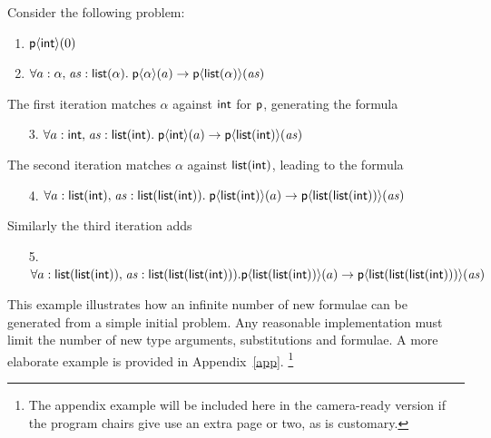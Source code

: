 \documentclass[runningheads]{llncs}
\begin{document}
\begin{examplex}\rm
Consider the following problem:
\begin{enumerate}
   \item \(\textsf{p}\langle \textsf{int}\rangle(0)\)
   \item \(\forall a: \alpha{,}\; \mathit{as}:\textsf{list}(\alpha){.}\; \textsf{p}\langle\alpha\rangle(a) \rightarrow \textsf{p}\langle \textsf{list}(\alpha)\rangle(\mathit{as})\)
\end{enumerate}
%
The first iteration matches \(\alpha\) against \(\textsf{int}\) for $\textsf{p}$, generating the formula
%
\begin{enumerate}
   \item[3.] \(\forall a: \textsf{int}{,}\; \mathit{as}:\textsf{list}(\textsf{int}){.}\; \textsf{p}\langle\textsf{int}\rangle(a) \rightarrow \textsf{p}\langle \textsf{list}(\textsf{int})\rangle(\mathit{as})\)
\end{enumerate}
%
The second iteration matches \(\alpha\) against \(\textsf{list}(\textsf{int})\), leading to the formula
%
\begin{enumerate}
   \item[4.] \(\forall a: \textsf{list}(\textsf{int}){,}\; \mathit{as}:\textsf{list}(\textsf{list}(\textsf{int})){.}\; \textsf{p}\langle\textsf{list}(\textsf{int})\rangle(a) \rightarrow \textsf{p}\langle \textsf{list}(\textsf{list}(\textsf{int}))\rangle(\mathit{as})\)
\end{enumerate}
%
Similarly the third iteration adds
%
\begin{enumerate}
   \item[5.] 
         \( \forall a: \textsf{list}(\textsf{list}(\textsf{int})){,}\; \mathit{as}:\textsf{list}(\textsf{list}(\textsf{list}(\textsf{int}))){.} \\ \textsf{p}\langle\textsf{list}(\textsf{list}(\textsf{int}))\rangle(a) \rightarrow \textsf{p}\langle \textsf{list}(\textsf{list}(\textsf{list}(\textsf{int})))\rangle(\mathit{as})\)
\end{enumerate}

\end{examplex}

This example illustrates how an infinite number of new formulae can be generated from a simple initial problem.
Any reasonable implementation must limit the number of new type arguments, substitutions and formulae.
A more elaborate example is provided in Appendix~\ref{app}.%
\footnote{The appendix example will be included here in the camera-ready version if
the program chairs give use an extra page or two, as is customary.}
\end{document}
